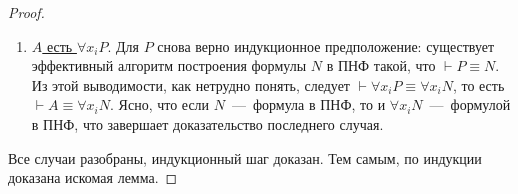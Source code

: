 \begin{proof}
\begin{enumerate}
        \item \underline{$A$ есть $\forall x_iP$}. Для $P$ снова верно индукционное предположение: существует эффективный алгоритм построения формулы $N$ в ПНФ такой, что $\vdash P \equiv N$. Из этой выводимости, как нетрудно понять, следует $\vdash \forall x_iP \equiv \forall x_iN$, то есть $\vdash A \equiv \forall x_iN$. Ясно, что если $N$~---~формула в ПНФ, то и $\forall x_iN$~---~формулой в ПНФ, что завершает доказательство последнего случая.
    \end{enumerate}
    Все случаи разобраны, индукционный шаг доказан. Тем самым, по индукции доказана искомая лемма.
\end{proof}